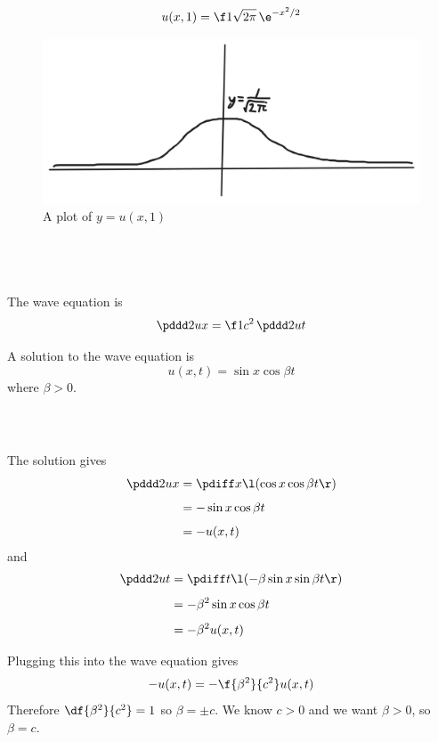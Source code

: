 \documentclass[a4paper]{article}
\begin{document}
$$u(x, 1) = \f1{\sqrt{2\pi}}\, \e^{-x^2 / 2}$$

\begin{figure}[h]
	\centering
	\includegraphics[scale=0.35]{Q1a-ii}
	\caption{A plot of $y = u(x,1)$}
\end{figure}

\subsection{~}

The wave equation is
$$\pddd 2ux = \f1{c^2}\, \pddd 2ut$$

A solution to the wave equation is
$$u(x, t) = \sin x \cos \beta t$$
where $\beta > 0$.

\subsubsection{~}

The solution gives \begin{align*}
\pddd 2ux &= \pdiff x \l( \cos x \cos \beta t \r)\\[1ex]
&= -\sin x \cos \beta t\\[1ex]
&= -u(x, t)
\end{align*}
and \begin{align*}
\pddd 2ut &= \pdiff t \l( -\beta \sin x \sin \beta t \r)\\[1ex]
&= -\beta^2 \sin x \cos \beta t\\[1ex]
&= -\beta^2 u(x, t)
\end{align*}

Plugging this into the wave equation gives $$-u(x, t) = -\f{\beta^2}{c^2} u(x, t)$$
Therefore $\df{\beta^2}{c^2} = 1$ so $\beta = \pm c$. We know $c > 0$ and we want $\beta > 0$, so $\beta = c$.

\subsubsection{~}
\end{document}
